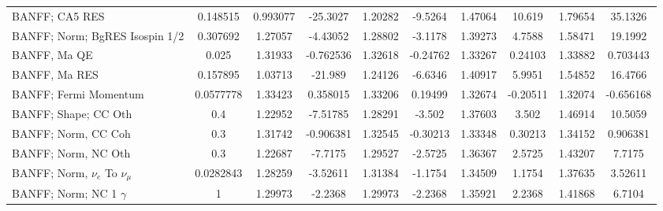 \documentclass{standalone}
\begin{document}
\begin{tabular}{| l | S | S  S | S  S | S  S | S  S | }
                                                                  BANFF; CA5 RES &        0.148515 &        0.993077 &        -25.3027 &         1.20282 &         -9.5264 &         1.47064 &          10.619 &         1.79654 &         35.1326 \\ 
                                                  BANFF; Norm; BgRES Isospin 1/2 &        0.307692 &         1.27057 &        -4.43052 &         1.28802 &         -3.1178 &         1.39273 &          4.7588 &         1.58471 &         19.1992 \\ 
                                                                    BANFF, Ma QE &           0.025 &         1.31933 &       -0.762536 &         1.32618 &        -0.24762 &         1.33267 &         0.24103 &         1.33882 &        0.703443 \\ 
                                                                   BANFF, Ma RES &        0.157895 &         1.03713 &         -21.989 &         1.24126 &         -6.6346 &         1.40917 &          5.9951 &         1.54852 &         16.4766 \\ 
                                                           BANFF; Fermi Momentum &       0.0577778 &         1.33423 &        0.358015 &         1.33206 &         0.19499 &         1.32674 &        -0.20511 &         1.32074 &       -0.656168 \\ 
                                                            BANFF; Shape; CC Oth &             0.4 &         1.22952 &        -7.51785 &         1.28291 &          -3.502 &         1.37603 &           3.502 &         1.46914 &         10.5059 \\ 
                                                             BANFF; Norm, CC Coh &             0.3 &         1.31742 &       -0.906381 &         1.32545 &        -0.30213 &         1.33348 &         0.30213 &         1.34152 &        0.906381 \\ 
                                                             BANFF; Norm, NC Oth &             0.3 &         1.22687 &         -7.7175 &         1.29527 &         -2.5725 &         1.36367 &          2.5725 &         1.43207 &          7.7175 \\ 
                                           BANFF; Norm, $\nu_{e}$ To $\nu_{\mu}$ &       0.0282843 &         1.28259 &        -3.52611 &         1.31384 &         -1.1754 &         1.34509 &          1.1754 &         1.37635 &         3.52611 \\ 
                                                      BANFF; Norm; NC 1 $\gamma$ &               1 &         1.29973 &         -2.2368 &         1.29973 &         -2.2368 &         1.35921 &          2.2368 &         1.41868 &          6.7104 \\ 

\end{tabular}
\end{document}
